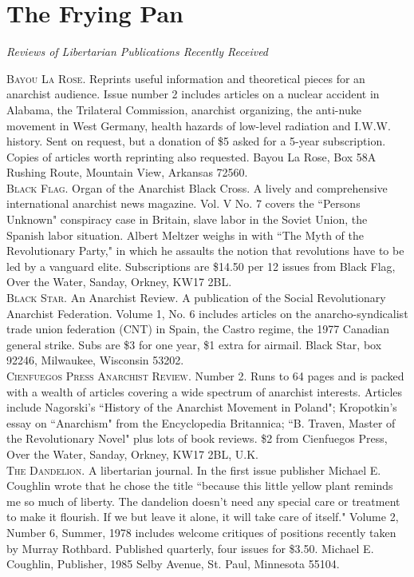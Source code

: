 \chapter{The Frying Pan}

\emph{Reviews of Libertarian Publications Recently Received\\}

\noindent \textsc{Bayou La Rose.} Reprints useful information and theoretical pieces for an anarchist audience. Issue number 2 includes articles on a nuclear accident in Alabama, the Trilateral Commission, anarchist organizing, the anti-nuke movement in West Germany, health hazards of low-level radiation and I.W.W. history. Sent on request, but a donation of \$5 asked for a 5-year subscription. Copies of articles worth reprinting also requested. Bayou La Rose, Box 58A Rushing Route, Mountain View, Arkansas 72560.\\

\noindent \textsc{Black Flag.} Organ of the Anarchist Black Cross. A lively and comprehensive international anarchist news magazine. Vol. V No. 7 covers the ``Persons Unknown" conspiracy case in Britain, slave labor in the Soviet Union, the Spanish labor situation. Albert Meltzer weighs in with ``The Myth of the Revolutionary Party," in which he assaults the notion that revolutions have to be led by a vanguard elite. Subscriptions are \$14.50 per 12 issues from Black Flag, Over the Water, Sanday, Orkney, KW17 2BL.\\

\noindent \textsc{Black Star.} An Anarchist Review. A publication of the Social Revolutionary Anarchist Federation. Volume 1, No. 6 includes articles on the anarcho-syndicalist trade union federation (CNT) in Spain, the Castro regime, the 1977 Canadian general strike. Subs are \$3 for one year, \$1 extra for airmail. Black Star, box 
92246, Milwaukee, Wisconsin 53202.\\

\noindent \textsc{Cienfuegos Press Anarchist Review}. Number 2. Runs to 64 pages and is packed with a wealth of articles covering a wide spectrum of anarchist interests. Articles include Nagorski's ``History of the Anarchist Movement in Poland"; Kropotkin's essay on ``Anarchism" from the Encyclopedia Britannica; ``B. Traven, Master of the Revolutionary Novel" plus lots of book reviews. \$2 from Cienfuegos Press, Over the Water, Sanday, Orkney, KW17 2BL, U.K.\\

\noindent \textsc{The Dandelion.} A libertarian journal. In the first issue publisher Michael E. Coughlin wrote that he chose the title ``because this little yellow plant reminds me so much of liberty. The dandelion doesn't need any special care or treatment to make it flourish. If we but leave it alone, it will take care of itself." Volume 2, Number 6, Summer, 1978 includes welcome critiques of positions recently taken by Murray Rothbard. Published quarterly, four issues for \$3.50. Michael E. Coughlin, Publisher, 1985 Selby Avenue, St. Paul, Minnesota 55104.\\

